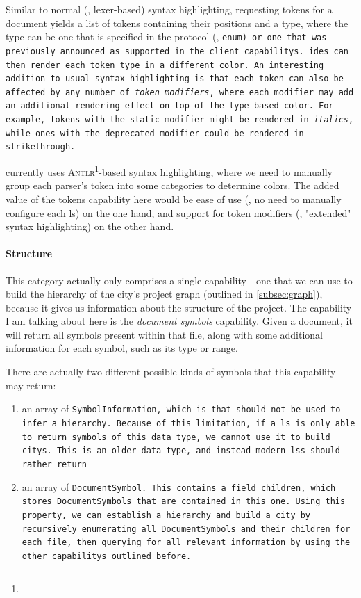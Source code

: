\documentclass[../thesis]{subfiles}
\begin{document}
\begin{itemize}
	      Similar to normal (\eg, lexer-based) syntax highlighting, requesting \glspl{token} for a document yields a list of tokens containing their positions and a type, where the type can be one that is specified in the protocol (\eg, \tt{enum}) or one that was previously announced as supported in the client \glspl{capability}.
	      \glspl{ide} can then render each token type in a different color.
	      An interesting addition to usual syntax highlighting is that each token can also be affected by any number of \emph{token modifiers}, where each modifier may add an additional rendering effect on top of the type-based color.
	      For example, tokens with the \tt{static} modifier might be rendered in \textit{italics}, while ones with the \tt{deprecated} modifier could be rendered in \st{strikethrough}.

	      \SEE{} currently uses \textsc{Antlr}\footnote{}-based syntax highlighting, where we need to manually group each parser's token into some categories to determine colors.
	      The added value of the \glspl{token} \gls{capability} here would be ease of use (\ie, no need to manually configure each \gls{ls}) on the one hand, and support for token modifiers (\ie, "extended" syntax highlighting) on the other hand.
\end{itemize}


\paragraph{Structure}
This category actually only comprises a single \gls{capability}---one that we can use to build the hierarchy of the \gls{city}'s project graph (outlined in \cref{subsec:graph}), because it gives us information about the structure of the project.
The \gls{capability} I am talking about here is the \emph{document symbols} \gls{capability}.
Given a document, it will return all symbols present within that file, along with some additional information for each symbol, such as its type or \gls{range}.

There are actually two different possible kinds of symbols that this \gls{capability} may return:
\begin{enumerate}
	\item an array of \tt{SymbolInformation}, which is  that should not be used to infer a hierarchy.
	      Because of this limitation, if a \gls{ls} is only able to return symbols of this data type, we cannot use it to build \glspl{city}.
	      This is an older data type, and instead modern \glspl{ls} should rather return
	\item an array of \tt{DocumentSymbol}.
	      This contains a field \tt{children}, which stores \tt{DocumentSymbol}s that are contained in this one.
	      Using this property, we can establish a hierarchy and build a \gls{city} by recursively enumerating all \tt{DocumentSymbol}s and their children for each file, then querying for all relevant information by using the other \glspl{capability} outlined before.
\end{enumerate}
\end{document}
